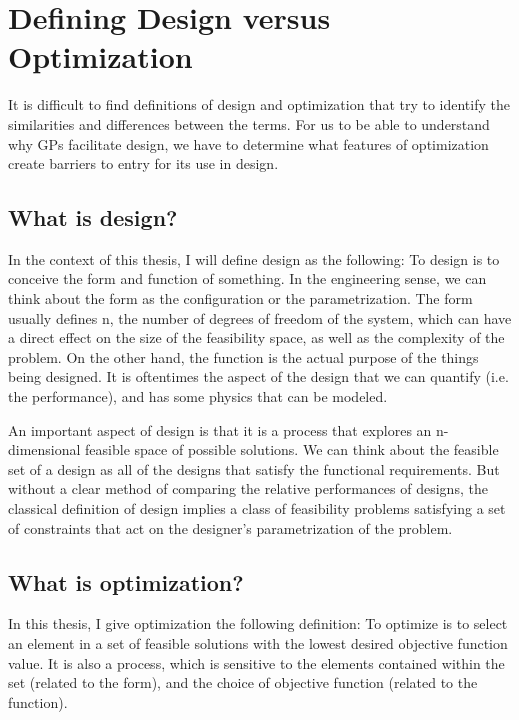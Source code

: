 \section{Defining Design versus Optimization} \label{s:DesVsOpt}

It is difficult to find definitions of design and optimization that
try to identify the similarities and differences between the terms. For us to be
able to understand why \gls{GP}s facilitate design, we have to determine what 
features of optimization create barriers to entry for its use in design. 

\subsection{What is design?}

In the context of this thesis, I will define design as the following:
To design is to conceive the form and function of something.
In the engineering sense, we can think about the form as the configuration or
the parametrization. The form usually defines n, the number of degrees of freedom
of the system, which can have a direct effect on the size of the feasibility
space, as well as the complexity of the problem.
On the other hand, the function is the actual purpose of the things
being designed. It is oftentimes the aspect of the design that we can
quantify (i.e. the performance), and has some physics that can be modeled.

An important aspect of design is that it is a process that explores an
n-dimensional feasible space of possible solutions.
We can think about the feasible set of a design as all of the designs
that satisfy the functional requirements. But without a clear method of comparing
the relative performances of designs, the classical
definition of design implies a class of feasibility problems satisfying a set of
constraints that act on the designer's parametrization of the problem.

\subsection{What is optimization?}

In this thesis, I give optimization the following definition: To optimize is to select an
element in a set of feasible solutions with the lowest desired objective
function value. It is also a process, which is sensitive to the elements contained within the set
(related to the form), and the choice of objective function (related to the 
function).

